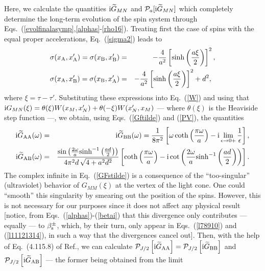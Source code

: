 \documentclass[]{nature}
\begin{document}
{Here, we calculate the quantities ${\rm i}\widetilde{G}_{MN}$ and ${\cal P}_{a}[{\rm i}\widetilde{G}_{MN}]$ 
which
completely determine the  long-term evolution of the spin system through Eqs.~(\ref{evolfinalasymp},\ref{alphas}-\ref{rho16}).
Treating first the case of spins with the equal proper accelerations,  Eq.~(\ref{sigma2}) leads to
\begin{eqnarray}
\sigma(x_{\rm A},x_{\rm A}')= \sigma(x_{\rm B},x_{\rm B}') &=& -\frac{4}{a^2}\left[\sinh\left(\frac{a\xi}{2}\right)\right]^2,
\label{sAA}
\\
\sigma(x_{\rm A},x_{\rm B}')= \sigma(x_{\rm B},x_{\rm A}') &=& -\frac{4}{a^2}\left[\sinh\left(\frac{a\xi}{2}\right)\right]^2+d^2,\;\;
\label{sAB}
\end{eqnarray}
where $\xi = \tau- \tau'$. Substituting these expressions into Eq.~(\ref{W}) and using that
 ${\rm i}G_{MN}(\xi) = \theta(\xi) W(x_M,x'_N)+\theta(-\xi) W(x'_N,x_M)$ --- where $\theta(\xi)$ is the 
Heaviside
step function ---, we obtain, using Eqs.~(\ref{Gftilde}) and (\ref{PV}), the quantities 
\begin{eqnarray}
{\rm i}\widetilde{G}_{\rm AA}(\omega)&=&{\rm i}\widetilde{G}_{\rm BB}(\omega) =\frac{1}{8\pi^2} 
\left[
\omega\coth
\left(\frac{\pi\omega}{a}\right)-{\rm i} \lim_{\epsilon \to 0+}\frac{1}{\epsilon}\right],
\label{GFstilde}
\\
{\rm i}\widetilde{G}_{\rm AB}(\omega)& =&\frac{\sin\left(
\frac{2\omega}{a} {\rm sinh}^{-1} \left(\frac{ad}{2}\right)\right)}{4\pi^2d\,\sqrt{4+a^2 d^2}} 
\left[
\coth
\left(\frac{\pi\omega}{a}\right)
-{\rm i} \cot\left(
\frac{2\omega}{a} {\rm sinh}^{-1} \left(\frac{ad}{2}\right)\right)\right].
\label{GFitilde}
\end{eqnarray}
The complex infinite in Eq.~(\ref{GFstilde}) is a consequence of the ``too-singular'' (ultraviolet)  behavior of $G_{MM}(\xi)$ at the
vertex of the light cone. One could ``smooth'' this singularity by smearing out the position of the spins. However,
this is not necessary for our purposes since it does not affect any physical result [notice, from Eqs.~(\ref{alphas})-(\ref{betai}) that this divergence only contributes ---
equally --- to $\beta^\pm_{\rm s}$, which, by their turn, only appear in Eqs.~(\ref{l78910}) and (\ref{l11121314}), in such a way that the divergences cancel out].
Then, with the help of Eq.~(4.115.8) of Ref.\cite{Grad}, we can calculate
${\cal P}_{J/2}\left[{\rm i}{\widetilde G}_{\rm AA}\right]={\cal P}_{J/2}\left[{\rm i}{\widetilde G}_{\rm BB}\right]$ and ${\cal P}_{J/2}\left[{\rm i}{\widetilde G}_{\rm AB}\right]$  --- the former being  obtained from the limit
}
\end{document}
